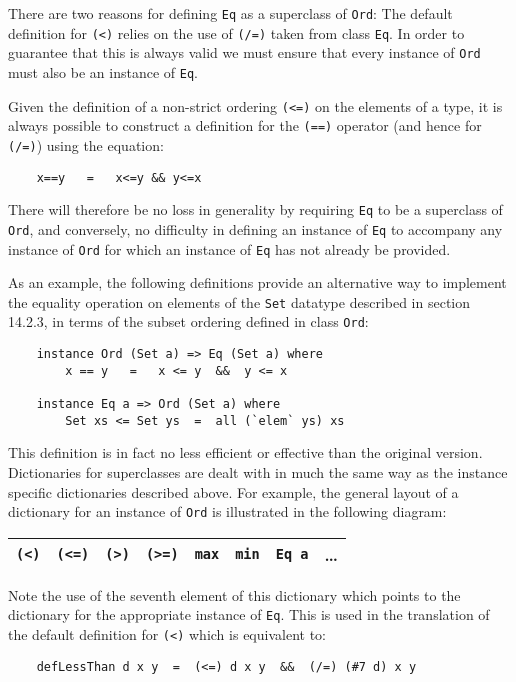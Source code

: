 There are two reasons for defining \verb"Eq" as a superclass of \verb"Ord":
\BI
\IT  The default definition for \verb"(<)" relies on the  use  of  
     \verb"(/=)"  taken
     from class \verb"Eq".  In order to guarantee that this is always valid we
     must ensure that every instance of \verb"Ord" must also be an instance of
     \verb"Eq".

\IT  Given the definition of a non-strict ordering \verb"(<=)" on the elements
     of a type, it is always possible to construct a definition for the
     \verb"(==)" operator (and hence for \verb"(/=)") using the equation:
\begin{verbatim}
    x==y   =   x<=y && y<=x
\end{verbatim}
     There will therefore be no loss in generality by requiring  \verb"Eq"  to
     be a superclass of \verb"Ord", and conversely, no difficulty in  defining
     an instance of \verb"Eq" to accompany any instance of \verb"Ord" 
     for which an
     instance of \verb"Eq" has not already be provided.

     As an example, the following definitions  provide  an  alternative
     way to implement the equality operation on  elements  of  the  \verb"Set"
     datatype described in section  14.2.3,  in  terms  of  the  subset
     ordering defined in class \verb"Ord":
\begin{verbatim}
    instance Ord (Set a) => Eq (Set a) where
        x == y   =   x <= y  &&  y <= x

    instance Eq a => Ord (Set a) where
        Set xs <= Set ys  =  all (`elem` ys) xs
\end{verbatim}
     This definition is in fact no less efficient or effective than the
     original version.
\EI
Dictionaries for superclasses are dealt with in much the  same  way  as
the instance specific dictionaries described above.  For  example,  the
general layout of a dictionary for an instance of \verb"Ord" is illustrated in
the following diagram:
\BQ
\begin{tabular}{|c|c|c|c|c|c|c|c}
\hline
 \verb"(<)"   &  \verb"(<=)"  &  \verb"(>)"   &  \verb"(>=)"  &
 \verb"max"   &  \verb"min"   &  \verb"Eq a"  & \dots \\
\hline
\end{tabular}
\EQ
%
Note the use of the seventh element of this dictionary which points  to
the dictionary for the appropriate instance of \verb"Eq".  This is used in the
translation of the default definition for \verb"(<)" which is equivalent to:
\begin{verbatim}
    defLessThan d x y  =  (<=) d x y  &&  (/=) (#7 d) x y
\end{verbatim}

